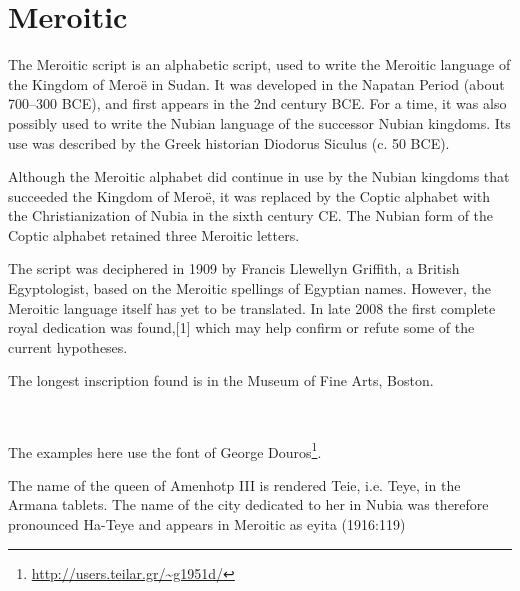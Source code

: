 \section{Meroitic}
\label{s:meroitic}

The Meroitic script is an alphabetic script, used to write the Meroitic language of the Kingdom of Meroë in Sudan. It was developed in the Napatan Period (about 700–300 BCE), and first appears in the 2nd century BCE. For a time, it was also possibly used to write the Nubian language of the successor Nubian kingdoms. Its use was described by the Greek historian Diodorus Siculus (c. 50 BCE).

Although the Meroitic alphabet did continue in use by the Nubian kingdoms that succeeded the Kingdom of Meroë, it was replaced by the Coptic alphabet with the Christianization of Nubia in the sixth century CE. The Nubian form of the Coptic alphabet retained three Meroitic letters.

The script was deciphered in 1909 by Francis Llewellyn Griffith, a British Egyptologist, based on the Meroitic spellings of Egyptian names. However, the Meroitic language itself has yet to be translated. In late 2008 the first complete royal dedication was found,[1] which may help confirm or refute some of the current hypotheses.

The longest inscription found is in the Museum of Fine Arts, Boston.

\newfontfamily{}^^A

%


The examples here use the  font of George Douros\footnote{\url{http://users.teilar.gr/~g1951d/}}.

The name of the queen of Amenhotp III is rendered Teie, i.e. Teye, in the Armana 
tablets. The name of the city dedicated to her in Nubia was therefore pronounced 
Ha-Teye and appears in Meroitic as eyita (1916:119)








